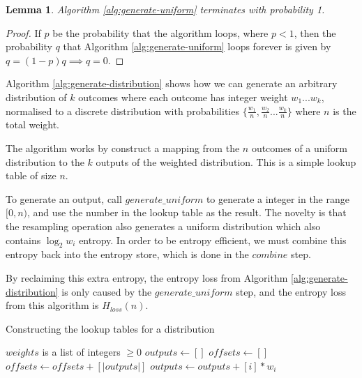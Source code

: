 \documentclass[12pt]{article}
\newtheorem{lemma}{Lemma}
\begin{document}
\begin{lemma}
Algorithm \ref{alg:generate-uniform} terminates with probability 1.
\end{lemma}

\begin{proof}
    If $p$ be the probability that the algorithm loops, where $p<1$, then the probability $q$ that Algorithm \ref{alg:generate-uniform} loops forever is given by $q = (1-p)q \implies q=0$.
\end{proof}

Algorithm \ref{alg:generate-distribution} shows how we can generate an arbitrary  distribution of $k$ outcomes where each outcome has integer weight ${w_1 ... w_k}$, normalised to a discrete distribution with probabilities $\{\frac{w_1}{n}, \frac{w_2}{n} ... \frac{w_k}{n}\}$ where $n$ is the total weight.

The algorithm works by construct a mapping from the $n$ outcomes of a uniform distribution to the $k$ outputs of the weighted distribution. This is a simple lookup table of size $n$.

To generate an output, call $generate\_uniform$ to generate a integer in the range $[0,n)$, and use the number in the lookup table as the result. The novelty is that the resampling operation also generates a uniform distribution which also contains $\log_2w_i$ entropy. In order to be entropy efficient, we must combine this entropy back into the entropy store, which is done in the $combine$ step.

By reclaiming this extra entropy, the entropy loss from Algorithm \ref{alg:generate-distribution} is only caused by the $generate\_uniform$ step, and the entropy loss from this algorithm is $H_{loss}(n)$.

\begin{algorithm}
\caption{Constructing the lookup tables for a distribution}
\label{alg:generate-lookup-tables}
\begin{algorithmic}[1]
\Require $weights$ is a list of integers $\ge0$
  \State $outputs \gets []$
  \State $offsets \gets []$
    \State $offsets \gets offsets + [|outputs|]$
    \State $outputs \gets outputs + [i] * w_i$
  \EndFor
\EndProcedure
\end{algorithmic}
\end{algorithm}
\end{document}
